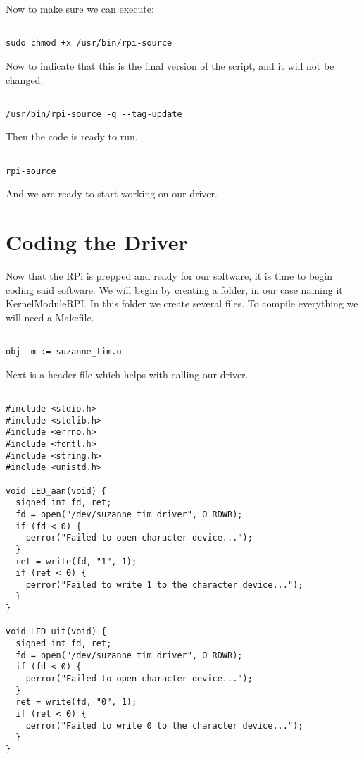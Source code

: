 \documentclass[
10pt, %
a4paper, %
oneside, %
headinclude,footinclude, %
BCOR5mm, %
]{scrartcl}
\begin{document}
Now to make sure we can execute:

\begin{lstlisting}

sudo chmod +x /usr/bin/rpi-source

\end{lstlisting}

Now to indicate that this is the final version of the script, and it will not be changed:

\begin{lstlisting}

/usr/bin/rpi-source -q --tag-update

\end{lstlisting}

Then the code is ready to run.

\begin{lstlisting}

rpi-source

\end{lstlisting}

And we are ready to start working on our driver.


\section{Coding the Driver}

Now that the RPi is prepped and ready for our software, it is time to begin coding said software. We will begin by creating a folder, in our case naming it KernelModuleRPI. In this folder we create several files. To compile everything we will need a Makefile.

\begin{lstlisting}

obj -m := suzanne_tim.o

\end{lstlisting}

Next is a header file which helps with calling our driver.

\begin{lstlisting}

#include <stdio.h>
#include <stdlib.h>
#include <errno.h>
#include <fcntl.h>
#include <string.h>
#include <unistd.h>

void LED_aan(void) {
  signed int fd, ret;
  fd = open("/dev/suzanne_tim_driver", O_RDWR);
  if (fd < 0) {
    perror("Failed to open character device...");
  }
  ret = write(fd, "1", 1);
  if (ret < 0) {
    perror("Failed to write 1 to the character device...");
  }
}

void LED_uit(void) {
  signed int fd, ret;
  fd = open("/dev/suzanne_tim_driver", O_RDWR);
  if (fd < 0) {
    perror("Failed to open character device...");
  }
  ret = write(fd, "0", 1);
  if (ret < 0) {
    perror("Failed to write 0 to the character device...");
  }
}
\end{lstlisting}
\end{document}
